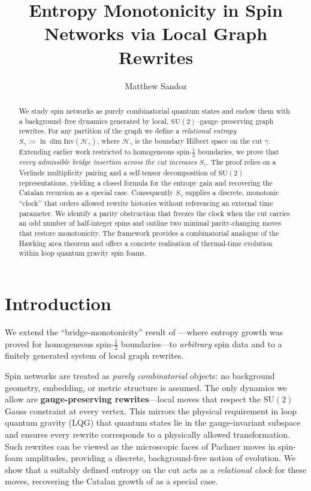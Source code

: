 \documentclass[11pt]{article}
\title{Entropy Monotonicity in Spin Networks via Local Graph Rewrites}
\author{Matthew Sandoz}
\newcommand{\SU}{\mathrm{SU}(2)}
\newcommand{\Inv}{\mathrm{Inv}}
\begin{document}
\maketitle

\begin{abstract}
We study spin networks as purely combinatorial quantum states and endow
them with a background--free dynamics generated by local,
$\mathrm{SU}(2)$--gauge--preserving graph rewrites.  For any partition of
the graph we define a \emph{relational entropy}
$S_{\gamma}:=\ln\!\dim\!\Inv(\mathcal H_\gamma)$, where
$\mathcal H_\gamma$ is the boundary Hilbert space on the cut
$\gamma$.  Extending earlier work restricted to homogeneous
spin-$\tfrac12$ boundaries, we prove that \emph{every admissible bridge
insertion across the cut increases $S_{\gamma}$}.  The proof relies on a
Verlinde multiplicity pairing and a self-tensor decomposition of
$\mathrm{SU}(2)$ representations, yielding a closed formula for the
entropy gain and recovering the Catalan recursion as a special case.
Consequently $S_{\gamma}$ supplies a discrete, monotonic “clock’’ that
orders allowed rewrite histories without referencing an external time
parameter.  We identify a parity obstruction that freezes the clock when
the cut carries an odd number of half-integer spins and outline two
minimal parity-changing moves that restore monotonicity.  The framework
provides a combinatorial analogue of the Hawking area theorem and offers
a concrete realisation of thermal-time evolution within loop quantum
gravity spin foams.
\end{abstract}

\tableofcontents


\section{Introduction} We extend the ``bridge-monotonicity'' result of \cite{Sandoz2025}—where entropy growth was proved for homogeneous spin-$\tfrac12$ boundaries—to \emph{arbitrary} spin data and to a finitely generated system of local graph rewrites.

Spin networks are treated as \emph{purely combinatorial} objects: no background geometry, embedding, or metric structure is assumed. The only dynamics we allow are \textbf{gauge-preserving rewrites}—local moves that respect the $\SU$ Gauss constraint at every vertex. This mirrors the physical requirement in loop quantum gravity (LQG) that quantum states lie in the gauge-invariant subspace and ensures every rewrite corresponds to a physically allowed transformation. Such rewrites can be viewed as the microscopic faces of Pachner moves in spin-foam amplitudes, providing a discrete, background-free notion of evolution. We show that a suitably defined entropy on the cut acts as a \emph{relational clock} for these moves, recovering the Catalan growth of \cite{Sandoz2025} as a special case.
\end{document}
